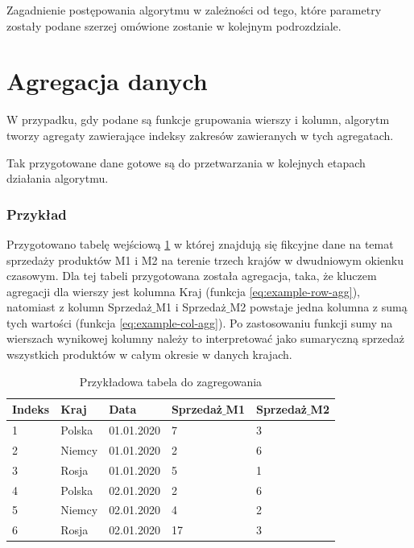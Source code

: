 \documentclass[brudnopis]{xmgr}
\begin{document}
Zagadnienie postępowania algorytmu w zależności od tego, które parametry zostały podane szerzej omówione zostanie w kolejnym podrozdziale.

\section{Agregacja danych}

W przypadku, gdy podane są funkcje grupowania wierszy i kolumn, algorytm tworzy agregaty zawierające indeksy zakresów zawieranych w tych agregatach.

Tak przygotowane dane gotowe są do przetwarzania w kolejnych etapach działania algorytmu.


\newpage
\subsubsection{Przykład}

Przygotowano tabelę wejściową \ref{tab:example-input} w której znajdują się fikcyjne dane na temat sprzedaży produktów M1 i M2 na terenie trzech krajów w dwudniowym okienku czasowym.
Dla tej tabeli przygotowana została agregacja, taka, że kluczem agregacji dla wierszy jest kolumna Kraj (funkcja \ref{eq:example-row-agg}), natomiast z kolumn Sprzedaż$\_$M1 i Sprzedaż$\_$M2 powstaje jedna kolumna z sumą tych wartości (funkcja \ref{eq:example-col-agg}).
Po zastosowaniu funkcji sumy na wierszach wynikowej kolumny należy to interpretować jako sumaryczną sprzedaż wszystkich produktów w całym okresie w danych krajach.

\begin{table}[!tbh]
\begin{tabular}{|l|l|l|l|l|} \hline
Indeks & Kraj & Data & Sprzedaż$\_$M1 & Sprzedaż$\_$M2 \\ \hline
1 & Polska & 01.01.2020 & 7 & 3 \\ \hline
2 & Niemcy & 01.01.2020 & 2 & 6 \\ \hline
3 & Rosja & 01.01.2020 & 5 & 1 \\ \hline
4 & Polska & 02.01.2020 & 2 & 6 \\ \hline
5 & Niemcy & 02.01.2020 & 4 & 2 \\ \hline
6 & Rosja & 02.01.2020 & 17 & 3 \\ \hline
\end{tabular}
\caption{Przykładowa tabela do zagregowania \label{tab:example-input}}
\end{table}
\end{document}

